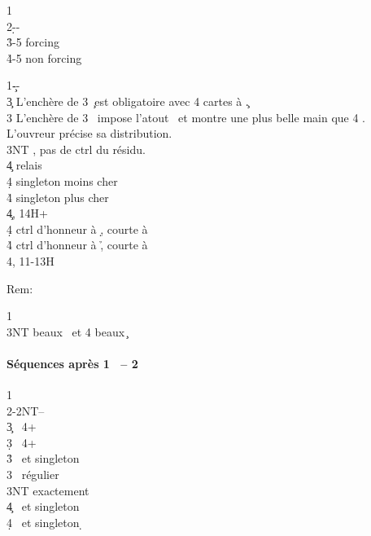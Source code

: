 \documentclass[a4paper]{article}
\begin{document}
\begin{bidtable}
1\c\\
2\d--\\
3\h {}-5 forcing\\
4\h {}-5 non forcing
\end{bidtable}

\begin{bidtable}
1\c--\\
3\c \> L’enchère de 3 \c\ est obligatoire avec 4 cartes à \c .\+\\
3\s \> L’enchère de 3 \s\ impose l’atout \s\ et montre une plus belle main que 4 \s .\\
\>L’ouvreur précise sa distribution.\+\\
3NT , pas de ctrl du résidu.\+\\
4\c \> relais\+\\
4\d \> singleton moins cher\\
4\h \> singleton plus cher\-\-\\
4\c {}, 14H+\\
4\d \> ctrl d’honneur à \d , courte à \h \\
4\h \> ctrl d’honneur à \h , courte à \d \\
4\s {}, 11-13H\-\-
\end{bidtable}

Rem:

\begin{bidtable}
1\c\\
3NT  beaux \s\ et 4 beaux \c 
\end{bidtable}

\paragraph{Séquences après 1 \pdfs\ – 2 \pdfh}

\begin{bidtable}
1\h\\
2\s-2NT--\\
3\c {} \s\ 4+ \c \\
3\d {} \s\ 4+ \d \\
3\h {} \s\ et singleton \h \\
3\s {} \s\ régulier\\
3NT  exactement\\
4\c {} \s\ et singleton \c \\
4\d {} \s\ et singleton \d 
\end{bidtable}
\end{document}
